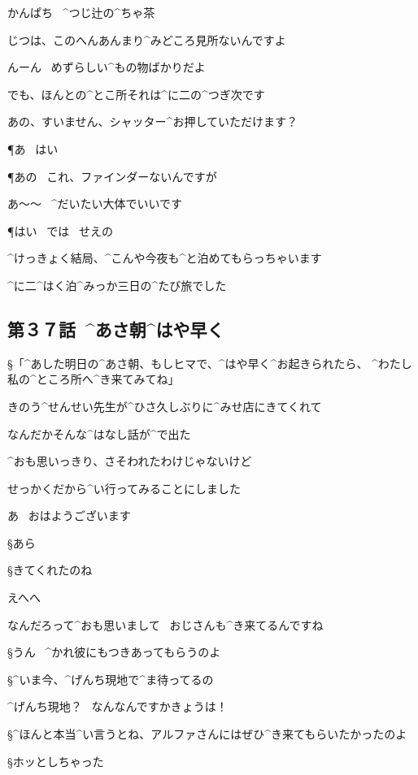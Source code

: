 \page
\Sign かんぱち
\ ^{つじ}{辻}の^{ちゃ}{茶}

\K じつは、このへんあんまり^{みどころ}{見所}ないんですよ

\A んーん
\ めずらしい^{もの}{物}ばかりだよ

\A でも、ほんとの^{とこ}{所}それは^{に}{二}の^{つぎ}{次}です

\page
\A あの、すいません、シャッター^{お}{押}していただけます？

\P あ
\ はい

\P あの
\ これ、ファインダーないんですが

\A あ〜〜
\ ^{だいたい}{大体}でいいです

\P はい
\ では
\ せえの

\page
\A ^{けっきょく}{結局}、^{こんや}{今夜}も^{と}{泊}めてもらっちゃいます

\A ^{に}{二}^{はく}{泊}^{みっか}{三日}の^{たび}{旅}でした


\subsection{第３７話\ ^{あさ}{朝}^{はや}{早}く}

\page[68]
\S 「^{あした}{明日}の^{あさ}{朝}、もしヒマで、^{はや}{早}く^{お}{起}きられたら、
  ^{わたし}{私}の^{ところ}{所}へ^{き}{来}てみてね」

\A きのう^{せんせい}{先生}が^{ひさ}{久}しぶりに^{みせ}{店}にきてくれて

\A なんだかそんな^{はなし}{話}が^{で}{出}た

\page
\A ^{おも}{思}いっきり、さそわれたわけじゃないけど

\A せっかくだから^{い}{行}ってみることにしました

\page
\A あ
\ おはようございます

\S あら

\page
\S きてくれたのね

\A えへへ

\A なんだろって^{おも}{思}いまして
\ おじさんも^{き}{来}てるんですね

\S うん
\ ^{かれ}{彼}にもつきあってもらうのよ

\S ^{いま}{今}、^{げんち}{現地}で^{ま}{待}ってるの

\A ^{げんち}{現地}？
\ なんなんですかきょうは！

\page
\S ^{ほんと}{本当}^{い}{言}うとね、アルファさんにはぜひ^{き}{来}てもらいたかったのよ

\S ホッとしちゃった

